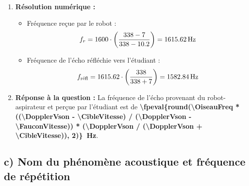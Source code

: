 \begin{enumerate}[label=\arabic*)]
    \item \textbf{Résolution numérique :}
    \begin{itemize}[label=-]
        \item Fréquence reçue par le robot :
        \[
        f_r = \OiseauFreq \cdot \left( \frac{\DopplerVson - \CibleVitesse}{\DopplerVson - \FauconVitesse} \right) = \qty{\fpeval{round(\OiseauFreq * ((\DopplerVson - \CibleVitesse) / (\DopplerVson - \FauconVitesse)), 2)}}{Hz}
        \]
        \item Fréquence de l'écho réfléchie vers l'étudiant :
        \[
        f_{\text{réfl}} = \fpeval{round(\OiseauFreq * ((\DopplerVson - \CibleVitesse) / (\DopplerVson - \FauconVitesse)), 2)} \cdot \left( \frac{\DopplerVson}{\DopplerVson + \CibleVitesse} \right) = \qty{\fpeval{round(\OiseauFreq * ((\DopplerVson - \CibleVitesse) / (\DopplerVson - \FauconVitesse)) * (\DopplerVson / (\DopplerVson + \CibleVitesse)), 2)}}{Hz}
        \]
    \end{itemize}

    \item \textbf{Réponse à la question :}
    La fréquence de l'écho provenant du robot-aspirateur et perçue par l'étudiant est de \textbf{\qty{\fpeval{round(\OiseauFreq * ((\DopplerVson - \CibleVitesse) / (\DopplerVson - \FauconVitesse)) * (\DopplerVson / (\DopplerVson + \CibleVitesse)), 2)}}{Hz}}.
\end{enumerate}



\subsection*{c) Nom du phénomène acoustique et fréquence de répétition}


